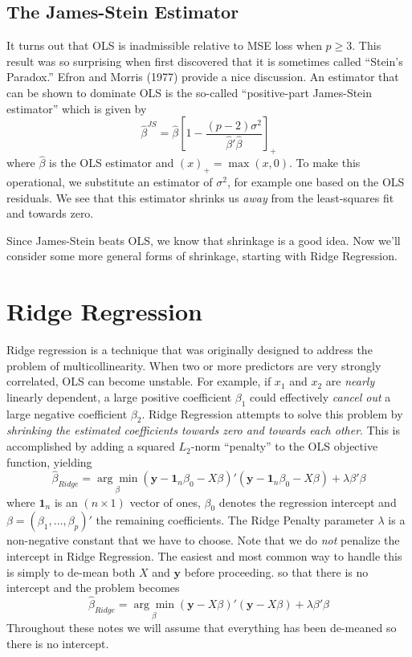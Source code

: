 \documentclass[12pt]{article}
\theoremstyle{definition}
\begin{document}
\subsection{The James-Stein Estimator}
It turns out that OLS is inadmissible relative to MSE loss when $p\geq 3$. This result was so surprising when first discovered that it is sometimes called ``Stein's Paradox.'' Efron and Morris (1977) provide a nice discussion. An estimator that can be shown to dominate OLS is the so-called ``positive-part James-Stein estimator'' which is given by
	$$\widehat{\beta}^{JS} = \widehat{\beta}\left[1 -\frac{(p-2)\sigma^2}{\widehat{\beta}' \widehat{\beta}} \right]_+$$
where $\widehat{\beta}$ is the OLS estimator and $(x)_+ = \max(x,0)$. To make this operational, we substitute an estimator of $\sigma^2$, for example one based on the OLS residuals. We see that this estimator shrinks us \emph{away} from the least-squares fit and towards zero. 

Since James-Stein beats OLS, we know that shrinkage is a good idea. Now we'll consider some more general forms of shrinkage, starting with Ridge Regression.



\section{Ridge Regression} 
Ridge regression is a technique that was originally designed to address the problem of multicollinearity. When two or more predictors are very strongly correlated, OLS can become unstable. For example, if $x_1$ and $x_2$ are \emph{nearly} linearly dependent, a large positive coefficient $\beta_1$ could effectively \emph{cancel out} a large negative coefficient $\beta_2$. Ridge Regression attempts to solve this problem by \emph{shrinking the estimated coefficients towards zero and towards each other}. This is accomplished by adding a squared $L_2$-norm ``penalty'' to the OLS objective function, yielding
	$$\widehat{\beta}_{Ridge} =\underset{\beta}{\arg \min} (\mathbf{y} - \textbf{1}_n\beta_0 - X\beta)' (\mathbf{y} - \textbf{1}_n \beta_0 - X\beta) + \lambda \beta'\beta$$
where $\textbf{1}_n$ is an $(n\times 1)$ vector of ones, $\beta_0$ denotes the regression intercept and $\beta = (\beta_1, \hdots, \beta_p)'$ the remaining coefficients. The Ridge Penalty parameter $\lambda$ is a non-negative constant that we have to choose. Note that we do \emph{not} penalize the intercept in Ridge Regression. The easiest and most common way to handle this is simply to de-mean both $X$ and $\mathbf{y}$ before proceeding. so that there is no intercept and the problem becomes
	$$\widehat{\beta}_{Ridge} =\underset{\beta}{\arg \min}(\mathbf{y} - X\beta)' (\mathbf{y} - X\beta) + \lambda \beta'\beta$$
Throughout these notes we will assume that everything has been de-meaned so there is no intercept.
\end{document}
